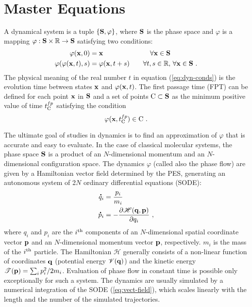 \section{Master Equations}

A dynamical system\cite{Holodniok1986} is a tuple \(\left\{ {\bf S} , \varphi \right\}\), where ${\bf S}$ is the phase space and $\varphi$ is a mapping \(\varphi : {\bf S} \times \mathbb{R} \rightarrow {\bf S} \) satisfying two conditions:
\begin{equation}
\label{eq:dyn-conds}
\begin{aligned}
\begin{split}
\varphi({\bf x}, 0) & = {\bf x} & \forall {\bf x} \in {\bf S} &
\\
\varphi(\varphi({\bf x},t), s) & = \varphi({\bf x}, t+s) ~~~ & \forall t,s \in \mathbb{R}, & ~ \forall {\bf x} \in {\bf S} ~.
\end{split}
\end{aligned}
\end{equation}
The physical meaning of the real number $t$ in equation (\ref{eq:dyn-conds}) is the evolution time between states ${\bf x}$ and $\varphi({\bf x},t)$.
The first passage time (FPT) can be defined for each point ${\bf x}$ in ${\bf S}$ and a set of points ${\rm C} \subset {\bf S}$ as the minimum positive value of time $t^{fp}_{\rm C}$ satisfying the condition
\begin{equation}
\label{eq:dynamika}
\varphi({\bf x}, t^{fp}_{\rm C}) \in {\rm C} ~.
\end{equation}

The ultimate goal of studies in dynamics is to find an approximation of $\varphi$ that is accurate and easy to evaluate.
In the case of classical molecular systems, the phase space ${\bf S}$ is a product of an $N$-dimensional momentum and an $N$-dimensional configuration space. 
The dynamics $\varphi$ (called also the phase flow) are given by a Hamiltonian vector field determined by the PES, generating an autonomous system of 2$N$ ordinary differential equations (SODE):
\begin{equation}
\label{eq:vect-field}
\begin{aligned}
\begin{split}
\accentset{\mbox{\large\bfseries .}}{q}_i & = \frac{p_i}{m_i}
\\
\accentset{\mbox{\large\bfseries .}}{p}_i & = - \frac{\partial \mathscr{H}({\bf q},{\bf p})}{\partial q_i} ~,
\end{split}
\end{aligned}
\end{equation}
where $q_i$ and $p_i$ are the $i^{\rm th}$ components of an $N$-dimensional spatial coordinate vector ${\bf p}$ and an $N$-dimensional momentum vector ${\bf p}$, respectively. $m_i$ is the mass of the $i^{\rm th}$ particle.
The Hamiltonian $\mathscr{H}$ generally consists of a non-linear function of coordinates ${\bf q}$ (potential energy $\mathscr{V}({\bf q})$) and the kinetic energy $\mathscr{T}({\bf p}) = \sum_i p_i^2 /2 m_i$.
Evaluation of phase flow in constant time is possible only exceptionally for such a system.
The dynamics are usually simulated by a numerical integration of the SODE (\ref{eq:vect-field}), which scales linearly with the length and the number of the simulated trajectories.

